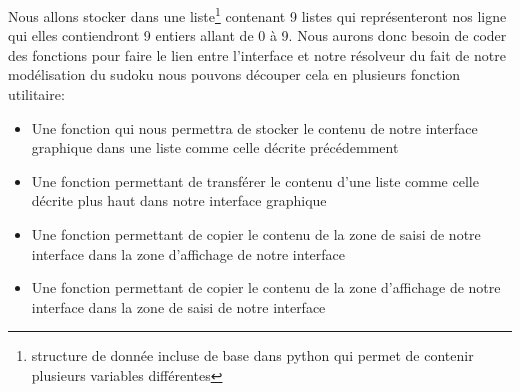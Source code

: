 Nous allons stocker dans une liste\footnote{\label{liste_Python}structure de donnée incluse de base dans python qui permet de contenir plusieurs variables différentes} contenant 9 listes qui représenteront nos ligne qui elles contiendront 9 entiers allant de 0 à 9. Nous aurons donc besoin de coder des fonctions pour faire le lien entre l'interface et notre résolveur du fait de notre modélisation du sudoku nous pouvons découper cela en plusieurs fonction utilitaire:\newline
\begin{itemize}
\item Une fonction qui nous permettra de stocker le contenu de notre interface graphique dans une liste comme celle décrite précédemment
\item Une fonction permettant de transférer le contenu d'une liste comme celle décrite plus haut dans notre interface graphique
\item Une fonction permettant de copier le contenu de la zone de saisi de notre interface dans la zone d'affichage de notre interface
\item Une fonction permettant de copier le contenu de la zone d'affichage de notre interface dans la zone de saisi de notre interface
\end{itemize}
